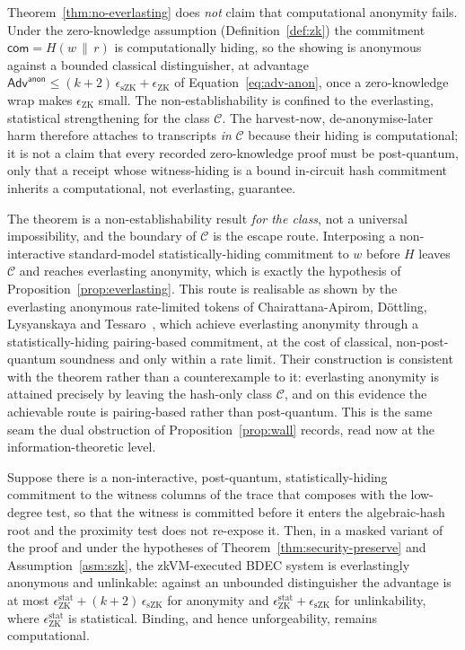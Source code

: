 \begin{remark}\label{rem:thaler-boundary}
    Theorem~\ref{thm:no-everlasting} does \emph{not} claim that computational anonymity fails. Under the zero-knowledge assumption (Definition~\ref{def:zk}) the commitment $\mathsf{com}=H(w\,\|\,r)$ is computationally hiding, so the showing is anonymous against a bounded classical distinguisher, at advantage $\mathsf{Adv}^{\mathsf{anon}}\le(k+2)\,\epsilon_{\mathrm{sZK}}+\epsilon_{\mathrm{ZK}}$ of Equation~\eqref{eq:adv-anon}, once a zero-knowledge wrap makes $\epsilon_{\mathrm{ZK}}$ small. The non-establishability is confined to the everlasting, statistical strengthening for the class $\mathcal C$. The harvest-now, de-anonymise-later harm therefore attaches to transcripts \emph{in} $\mathcal C$ because their hiding is computational; it is not a claim that every recorded zero-knowledge proof must be post-quantum, only that a receipt whose witness-hiding is a bound in-circuit hash commitment inherits a computational, not everlasting, guarantee.
    
    The theorem is a non-establishability result \emph{for the class}, not a universal impossibility, and the boundary of $\mathcal C$ is the escape route. Interposing a non-interactive standard-model statistically-hiding commitment to $w$ before $H$ leaves $\mathcal C$ and reaches everlasting anonymity, which is exactly the hypothesis of Proposition~\ref{prop:everlasting}. This route is realisable as shown by the everlasting anonymous rate-limited tokens of Chairattana-Apirom, D\"ottling, Lysyanskaya and Tessaro~\cite{cryptoeprint:2025/1030}, which achieve everlasting anonymity through a statistically-hiding pairing-based commitment, at the cost of classical, non-post-quantum soundness and only within a rate limit. Their construction is consistent with the theorem rather than a counterexample to it: everlasting anonymity is attained precisely by leaving the hash-only class $\mathcal C$, and on this evidence the achievable route is pairing-based rather than post-quantum. This is the same seam the dual obstruction of Proposition~\ref{prop:wall} records, read now at the information-theoretic level.
\end{remark}

\begin{proposition}\label{prop:everlasting}
    Suppose there is a non-interactive, post-quantum, statistically-hiding commitment to the witness columns of the trace that composes with the low-degree test, so that the witness is committed before it enters the algebraic-hash root and the proximity test does not re-expose it. Then, in a masked variant of the proof and under the hypotheses of Theorem~\ref{thm:security-preserve} and Assumption~\ref{asm:szk}, the zkVM-executed BDEC system is everlastingly anonymous and unlinkable: against an unbounded distinguisher the advantage is at most $\epsilon_{\mathrm{ZK}}^{\mathrm{stat}} + (k+2)\,\epsilon_{\mathrm{sZK}}$ for anonymity and $\epsilon_{\mathrm{ZK}}^{\mathrm{stat}} + \epsilon_{\mathrm{sZK}}$ for unlinkability, where $\epsilon_{\mathrm{ZK}}^{\mathrm{stat}}$ is statistical. Binding, and hence unforgeability, remains computational.
\end{proposition}

